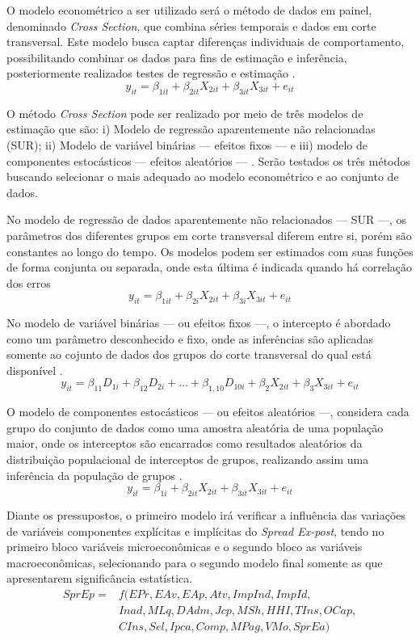 \documentclass[12pt,12pt,openright,oneside,a4paper,chapter=TITLE,section=TITLE,subsection=TITLE,subsubsection=TITLE,english,french,spanish,portugues,sumario=tradicional]{abntex2}
\begin{document}
O modelo econométrico a ser utilizado será o método de dados em painel, denominado \emph{Cross Section}, que combina séries temporais e dados em corte transversal. Este modelo busca captar diferenças individuais de comportamento, possibilitando combinar os dados para fins de estimação e inferência, posteriormente realizados testes de regressão e estimação \cite{hill:2010}.
\[
y_{it} = \beta_{1it} + \beta_{2it}X_{2it} + \beta_{3it}X_{3it} + e_{it}
\]

O método \emph{Cross Section} pode ser realizado por meio de três modelos de estimação que são: i) Modelo de regressão aparentemente não relacionadas (SUR); ii) Modelo de variável binárias --- efeitos fixos --- e iii) modelo de componentes estocásticos --- efeitos aleatórios --- \cite{hill:2010}. Serão testados os três métodos buscando selecionar o mais adequado ao modelo econométrico e ao conjunto de dados.

No modelo de regressão de dados aparentemente não relacionados --- SUR ---, os parâmetros dos diferentes grupos em corte transversal diferem entre si, porém são constantes ao longo do tempo. Os modelos podem ser estimados com suas funções de forma conjunta ou separada, onde esta última é indicada quando há correlação dos erros \cite{hill:2010}
\[
y_{it} = \beta_{1it} + \beta_{2i}X_{2it} + \beta_{3i}X_{3it} + e_{it}
\]

No modelo de variável binárias --- ou efeitos fixos ---, o intercepto é abordado como um parâmetro desconhecido e fixo, onde as inferências são aplicadas somente ao cojunto de dados dos grupos do corte transversal do qual está disponível \cite{hill:2010}.
\[
y_{it} = \beta_{11}D_{1i} + \beta_{12}D_{2i} + ... + \beta_{1,10}D_{10i} + \beta_{2}X_{2it} + \beta_{3}X_{3it} + e_{it}
\]

O modelo de componentes estocásticos --- ou efeitos aleatórios ---, considera cada grupo do conjunto de dados como uma amostra aleatória de uma população maior, onde os interceptos são encarrados como resultados aleatórios da distribuição populacional de interceptos de grupos, realizando assim uma inferência da população de grupos \cite{hill:2010}.
\[
y_{it} = \beta_{1i} + \beta_{2it}X_{2it} + \beta_{3it}X_{3it} + e_{it}
\]

Diante os pressupostos, o primeiro modelo irá verificar a influência das variações de variáveis componentes explícitas e implícitas do \emph{Spread Ex-post}, tendo no primeiro bloco variáveis microeconômicas e o segundo bloco as variáveis macroeconômicas, selecionando para o segundo modelo final somente as que apresentarem significância estatística.
\[\begin{aligned}
SprEp = &f(EPr, EAv, EAp, Atv, ImpInd, ImpId, \\ 
& Inad, MLq, DAdm, Jcp, MSh, HHI, TIns, OCap, \\ 
& CIns, Sel, Ipca, Comp, MPag, VMo, SprEa)
\end{aligned}\]
\end{document}
